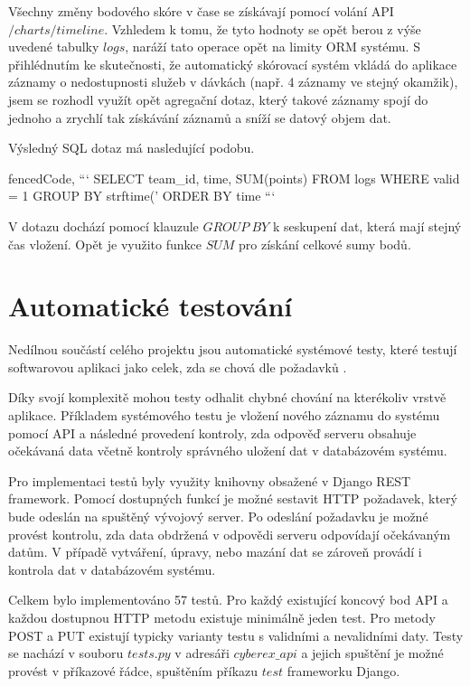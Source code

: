 \documentclass[
  digital, %
  twoside, %
  table,   %
  lof,     %
  lot,     %
]{fithesis3}
\begin{document}
Všechny změny bodového skóre v čase se získávají pomocí volání API $/charts/timeline$. Vzhledem k tomu, že tyto hodnoty se opět berou z výše uvedené tabulky $logs$, naráží tato operace opět na limity ORM systému. S přihlédnutím ke skutečnosti, že automatický skórovací systém vkládá do aplikace záznamy o nedostupnosti služeb v dávkách (např. 4 záznamy ve stejný okamžik), jsem se rozhodl využít opět agregační dotaz, který takové záznamy spojí do jednoho a zrychlí tak získávání záznamů a sníží se datový objem dat.

Výsledný SQL dotaz má nasledující podobu.

\begin{markdown*}{%
  fencedCode,
}
```
SELECT team_id, time, SUM(points) FROM logs 
WHERE valid = 1 
GROUP BY strftime('%
ORDER BY time
```
\end{markdown*}

V dotazu dochází pomocí klauzule $GROUP\ BY$ k seskupení dat, která mají stejný čas vložení. Opět je využito funkce $SUM$ pro získání celkové sumy bodů.

\section{Automatické testování}

Nedílnou součástí celého projektu jsou automatické systémové testy, které testují softwarovou aplikaci jako celek, zda se chová dle požadavků \cite{difSysTest}.

Díky svojí komplexitě mohou testy odhalit chybné chování na kterékoliv vrstvě aplikace. Příkladem systémového testu je vložení nového záznamu do systému pomocí API a následné provedení kontroly, zda odpověď serveru obsahuje očekávaná data včetně kontroly správného uložení dat v databázovém systému.

Pro implementaci testů byly využity knihovny obsažené v Django REST framework. Pomocí dostupných funkcí je možné sestavit HTTP požadavek, který bude odeslán na spuštěný vývojový server. Po odeslání požadavku je možné provést kontrolu, zda data obdržená v odpovědi serveru odpovídají očekávaným datům. V případě vytváření, úpravy, nebo mazání dat se zároveň provádí i kontrola dat v databázovém systému. 

Celkem bylo implementováno 57 testů. Pro každý existující koncový bod API a každou dostupnou HTTP metodu existuje minimálně jeden test. Pro metody POST a PUT existují typicky varianty testu s validními a nevalidními daty. Testy se nachází v souboru $tests.py$ v adresáři $cyberex\_api$ a jejich spuštění je možné provést v příkazové řádce, spuštěním příkazu $test$ frameworku Django.
\end{document}
